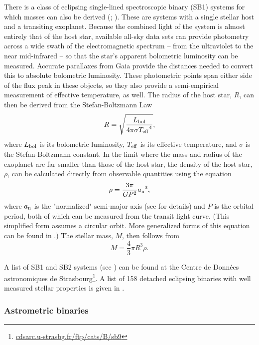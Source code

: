 \documentclass[twocolumn,tighten,twocolappendix]{aastex631}
\begin{document}
There is a class of eclipsing single-lined spectroscopic binary (SB1) systems for which masses can also be derived (\citealt{stassun2017}; \citealt{stevens2018}). These are systems with a single stellar host and a transiting exoplanet. Because the combined light of the system is almost entirely that of the host star, available all-sky data sets can provide photometry across a wide swath of the electromagnetic spectrum -- from the ultraviolet to the near mid-infrared -- so that the star's apparent bolometric luminosity can be measured. Accurate parallaxes from Gaia provide the distances needed to convert this to absolute bolometric luminosity. These photometric points span either side of the flux peak in these objects, so they also provide a semi-empirical measurement of effective temperature, as well. The radius of the host star, $R$, can then be derived from the Stefan-Boltzmann Law
\begin{equation}
\label{eqn:stefan-boltzmann}
    R = \sqrt{\frac{L_{\rm bol}}{4\pi\sigma{T_{\rm eff}}^4}},
\end{equation}
where $L_{\rm bol}$ is its bolometric luminosity, $T_{\rm eff}$ is its effective temperature, and $\sigma$ is the Stefan-Boltzmann constant. In the limit where the mass and radius of the exoplanet are far smaller than those of the host star, the density of the host star, $\rho$, can be calculated directly from observable quantities using the equation
\begin{equation}
    \rho = \frac{3{\pi}}{GP^2}{a_{\rm n}}^3,
\end{equation}
where $a_{\rm n}$ is the "normalized" semi-major axis (see \citealt{sandford2017} for details) and $P$ is the orbital period, both of which can be measured from the transit light curve. (This simplified form assumes a circular orbit. More generalized forms of this equation can be found in \citealt{seager2003}.) The stellar mass, $M$, then follows from
\begin{equation}
    M = \frac{4}{3}{\pi}R^3\rho.
\end{equation}

A list of SB1 and SB2 systems (see \citealt{pourbaix2009}) can be found at the Centre de Donn{\'e}es astronomiques de Strasbourg\footnote{\url{cdsarc.u-strasbg.fr/ftp/cats/B/sb9}}. A list of 158 detached eclipsing binaries with well measured stellar properties is given in \cite{stassun2016}. 

\subsubsection{Astrometric binaries\label{sec:astrometric_binaries}}
\end{document}
